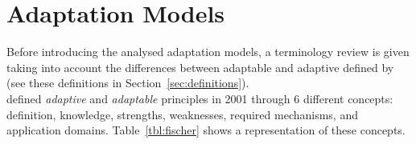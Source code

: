 \section{Adaptation Models}
\label{sec:adaptation_models}

Before introducing the analysed adaptation models, a terminology review is
given taking into account the differences between adaptable and adaptive
defined by \citeauthor{fischer_user_2001} (see these definitions in 
Section~\ref{sec:definitions}). \\

\citet{fischer_user_2001} defined \textit{adaptive} and \textit{adaptable} 
principles in 2001 through 6 different concepts: definition, knowledge, strengths, weaknesses, required mechanisms, and application domains. 
Table~\ref{tbl:fischer} shows a representation of these concepts.

